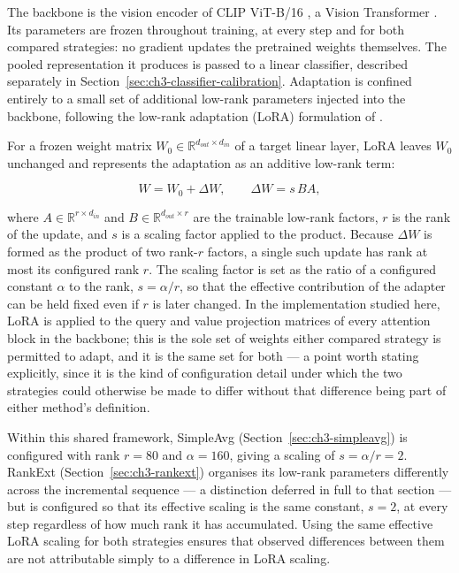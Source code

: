 The backbone is the vision encoder of CLIP ViT-B/16 \parencite{radford2021learning},
a Vision Transformer \parencite{dosovitskiy2021image}. Its parameters are frozen
throughout training, at every step and for both compared strategies: no
gradient updates the pretrained weights themselves. The pooled
representation it produces is passed to a linear classifier, described
separately in Section~\ref{sec:ch3-classifier-calibration}. Adaptation is confined entirely to a small set
of additional low-rank parameters injected into the backbone, following
the low-rank adaptation (LoRA) formulation of \cite{hu2021lora}.

For a frozen weight matrix $W_0 \in \mathbb{R}^{d_{out} \times d_{in}}$ of
a target linear layer, LoRA leaves $W_0$ unchanged and represents the
adaptation as an additive low-rank term:

\begin{equation}
\label{eq:ch3-lora-update}
W = W_0 + \Delta W, \qquad \Delta W = s \, B A,
\end{equation}

where $A \in \mathbb{R}^{r \times d_{in}}$ and $B \in \mathbb{R}^{d_{out}
\times r}$ are the trainable low-rank factors, $r$ is the rank of the
update, and $s$ is a scaling factor applied to the product. Because
$\Delta W$ is formed as the product of two rank-$r$ factors, a single such
update has rank at most its configured rank $r$. The scaling factor is set as the ratio of a
configured constant $\alpha$ to the rank, $s = \alpha / r$, so that the
effective contribution of the adapter can be held fixed even if $r$ is
later changed. In the implementation studied here, LoRA is applied to the
query and value projection matrices of every attention block in the
backbone; this is the sole set of weights either compared strategy is
permitted to adapt, and it is the same set for both --- a point worth stating
explicitly, since it is the kind of configuration detail under which the
two strategies could otherwise be made to differ without that difference
being part of either method's definition.

Within this shared framework, SimpleAvg (Section~\ref{sec:ch3-simpleavg}) is configured with
rank $r = 80$ and $\alpha = 160$, giving a scaling of $s = \alpha/r = 2$.
RankExt (Section~\ref{sec:ch3-rankext}) organises its low-rank parameters differently
across the incremental sequence --- a distinction deferred in full to that
section --- but is configured so that its effective scaling is the same
constant, $s = 2$, at every step regardless of how much rank it has
accumulated. Using the same effective LoRA scaling for both strategies
ensures that observed differences between them are not attributable simply
to a difference in LoRA scaling.

